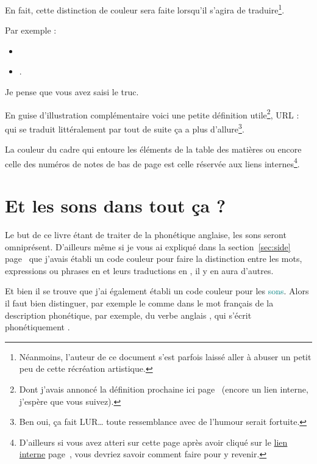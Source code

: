 En fait, cette distinction de couleur sera faite lorsqu'il s'agira de
traduire\footnote{Néanmoins, l'auteur de ce document s'est parfois 
  laissé aller à abuser un petit peu de cette récréation artistique.}.

Par exemple :
\begin{itemize}
\item {}
\item {}.  
\end{itemize}

Je pense que vous avez saisi le truc.

En guise d'illustration complémentaire voici une petite définition
utile\footnote{Dont j'avais annoncé la définition prochaine ici
  page~\pageref{sec:link} (encore un lien interne, j'espère que vous
  suivez).}, URL :  qui se traduit
littéralement par  tout de
suite ça a plus d'allure\footnote{Ben oui, ça fait LUR\dots\xspace toute
  ressemblance avec de l'humour serait fortuite.}.

La couleur du cadre qui entoure les éléments de la table des matières
ou encore celle des numéros de notes de bas de page est celle réservée
aux \hypertarget{linkin}{liens internes}\footnote{D'ailleurs si vous
  avez atteri sur cette page après avoir cliqué sur le
  \hyperlink{retour}{lien interne} page~\pageref{retour}, vous devriez
savoir comment faire pour y revenir.}. 

\newpage

\section{Et les sons dans tout ça ?}\label{sec:phonetics}

Le but de ce livre étant de traiter de la phonétique anglaise, les
sons seront omniprésent. D'ailleurs même si je vous ai expliqué dans
la section~\ref{sec:side} page~\pageref{sec:side} que j'avais établi un code
couleur pour faire la distinction entre les mots, expressions ou
phrases en  et leurs traductions en , il
y en aura d'autres.

Et bien il se trouve que j'ai également établi un code couleur pour
les \textcolor{teal}{sons}. Alors il faut bien distinguer, par exemple
le \son {} comme dans le mot français  de la
description phonétique, par exemple, du verbe anglais , qui
s'écrit phonétiquement .

